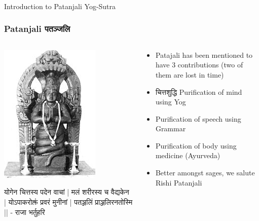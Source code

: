 \begin{frame}[fragile]\frametitle{}
\begin{center}
{\Large Introduction to Patanjali Yog-Sutra}
\end{center}
\end{frame}

 \begin{frame}[fragile]\frametitle{Patanjali  पतञ्जलि }
 
    \begin{columns}
    \begin{column}[t]{0.4\linewidth}
	
\begin{center}
\includegraphics[width=0.5\linewidth,keepaspectratio]{images/yog15}
\end{center}

\begin{sanskrit}
योगेन चित्तस्य पदेन वाचां |
मलं शरीरस्य च वैद्यकेन |
योऽपाकरोक्तं प्रवरं मुनीनां |
पतञ्जलिं प्राञ्जलिरनतोस्मि ||
- राजा भर्तुहरि
\end{sanskrit}

    \end{column}
    \begin{column}[t]{0.6\linewidth}
		\begin{itemize}
	\item Patajali has been mentioned to have 3 contributions (two of them are lost in time)
	\item चित्तशुद्धि Purification of mind using Yog
	\item Purification of speech using Grammar
	\item Purification of body using medicine (Ayurveda)
	\item Better amongst sages, we salute Rishi Patanjali
	\end{itemize}

    \end{column}
  \end{columns}
\end{frame}

